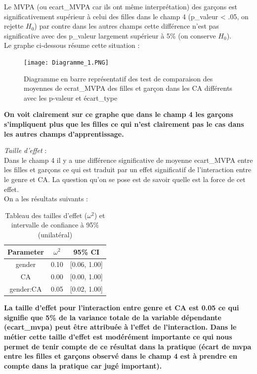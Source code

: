 \documentclass[12pt,a4paper]{article}
\begin{document}
	Le MVPA (ou ecart\_MVPA car ils ont même interprétation) des garçons est significativement supérieur à celui des filles dans le champ 4 (p\_valeur < .05, on rejette $H_0$) par contre dans les autres champs cette différence n'est pas significative avec des p\_valeur largement supérieur à 5\% (on conserve $H_0$).\\
	Le graphe ci-dessous résume cette situation	:
	\begin{figure}[H]
		\centering
		\texttt{[image: Diagramme\_1.PNG]}
		\caption{Diagramme en barre représentatif des test de comparaison des moyennes de ecrat\_MVPA des filles et garçon dans les CA différents avec les p-valeur et écart\_type}
		\label{fig:Test post hoc}
	\end{figure}
	\textbf{On voit clairement sur ce graphe que dans le champ 4 les garçons s'impliquent plus que les filles ce qui n'est clairement pas le cas dans les autres champs d'apprentissage.}
	
	\textit{Taille d'effet} : \\
	Dans le champ 4 il y a une différence significative de moyenne ecart\_MVPA entre les filles et garçons ce qui est traduit par un effet significatif de l'interaction entre le genre et CA. La question qu'on se pose est de savoir quelle est la force de cet effet.\\
	On a les résultats suivants : \\
	\begin{table}[H]
		\centering
		\begin{tabular}{ccc}
			\toprule
			Parameter & $\omega^2$ & 95\% CI \\
			\midrule
			gender & 0.10 & [0.06, 1.00] \\
			CA & 0.00 & [0.00, 1.00] \\
			gender:CA & 0.05 & [0.02, 1.00] \\
			\bottomrule
		\end{tabular}
		\caption{Tableau des tailles d'effet ($\omega^2$) et intervalle de confiance à 95\% (unilatéral)}
		\label{table:2}
	\end{table}
	\textbf{La taille d'effet pour l'interaction entre genre et CA est 0.05 ce qui signifie que 5\% de la variance totale de la variable dépendante (ecart\_mvpa) peut être attribuée à l'effet de l'interaction. Dans le métier cette taille d'effet est modérément importante ce qui nous permet de tenir compte de ce résultat dans la pratique (écart de mvpa entre les filles et garçons observé dans le champ 4 est à prendre en compte dans la pratique car jugé important).}
	
\end{document}
